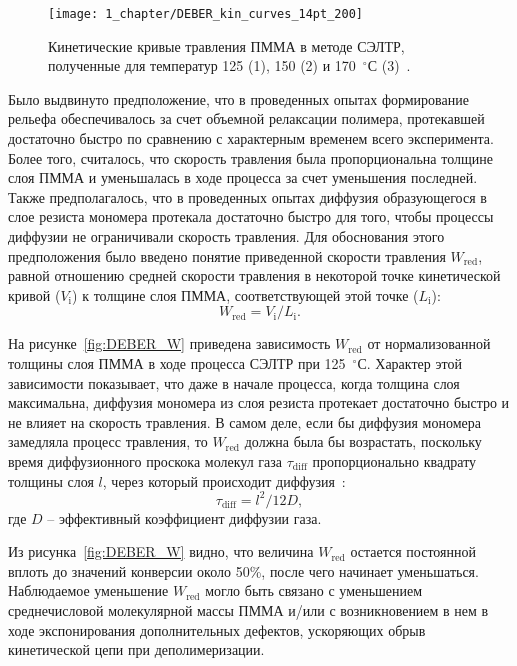 \begin{figure}[h]
	\centering
	\texttt{[image: 1\_chapter/DEBER\_kin\_curves\_14pt\_200]}
	\vspace{0.5em}
	\caption{Кинетические кривые травления ПММА в методе СЭЛТР, полученные для температур 125 (1), 150 (2) и 170~$^\circ$С (3)~\cite{Bruk_2013}.}
	\label{fig:kin_curves}
\end{figure}

Было выдвинуто предположение, что в проведенных опытах формирование рельефа обеспечивалось за счет объемной релаксации полимера, протекавшей достаточно быстро по сравнению с характерным временем всего эксперимента.
Более того, считалось, что скорость травления была пропорциональна толщине слоя ПММА и уменьшалась в ходе процесса за счет уменьшения последней.
Также предполагалось, что в проведенных опытах диффузия образующегося в слое резиста мономера протекала достаточно быстро для того, чтобы процессы диффузии не ограничивали скорость травления.
Для обоснования этого предположения было введено понятие приведенной скорости травления $W_\mathrm{red}$, равной отношению средней скорости травления в некоторой точке кинетической кривой ($V_\mathrm{i}$) к толщине слоя ПММА, соответствующей этой точке ($L_\mathrm{i}$):
\begin{equation}
	W_\mathrm{red} = V_\mathrm{i} / L_\mathrm{i}.
\end{equation}

На рисунке~\ref{fig:DEBER_W} приведена зависимость $W_\mathrm{red}$ от нормализованной толщины слоя ПММА в ходе процесса СЭЛТР при 125~$^\circ$С. Характер этой зависимости показывает, что даже в начале процесса, когда толщина слоя максимальна, диффузия мономера из слоя резиста протекает достаточно быстро и не влияет на скорость травления. В самом деле, если бы диффузия мономера замедляла процесс травления, то $W_\mathrm{red}$ должна была бы возрастать, поскольку время диффузионного проскока молекул газа $\tau_\mathrm{diff}$ пропорционально квадрату толщины слоя $l$, через который происходит диффузия~\cite{Bruk_2000}:
\begin{equation}
	\tau_\mathrm{diff} = l^2 / 12 D,
\end{equation}
где $D$ -- эффективный коэффициент диффузии газа.

Из рисунка~\ref{fig:DEBER_W} видно, что величина $W_\mathrm{red}$ остается постоянной вплоть до значений конверсии около 50\%, после чего начинает уменьшаться. Наблюдаемое уменьшение $W_\mathrm{red}$ могло быть связано с уменьшением среднечисловой молекулярной массы ПММА и/или с возникновением в нем в ходе экспонирования дополнительных дефектов, ускоряющих обрыв кинетической цепи при деполимеризации.

